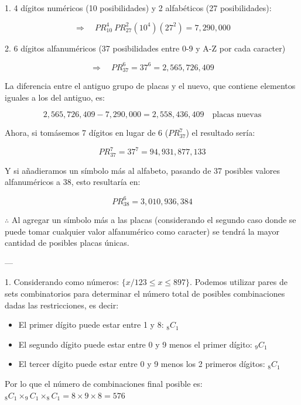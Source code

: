 \documentclass{article}
\begin{document}
1. 4 dígitos numéricos (10 posibilidades) y 2 alfabéticos (27 posibilidades):

$$\Rightarrow \quad PR^{4}_{10} \medspace PR^{2}_{27} (10^4)(27^2) = 7,290,000$$

2. 6 dígitos alfanuméricos (37 posibilidades entre 0-9 y A-Z por cada caracter)

$$\Rightarrow \quad PR^{6}_{37} = 37^6 = 2,565,726,409$$

La diferencia entre el antiguo grupo de placas y el nuevo, que contiene elementos iguales a los del antiguo, es:

$$2,565,726,409 - 7,290,000 = 2,558,436,409 \quad \text{placas nuevas}$$

Ahora, si tomásemos 7 dígitos en lugar de 6 ($PR^{7}_{37}$) el resultado sería:

$$PR^{7}_{37} = 37^7 = 94,931,877,133$$

Y si añadieramos un símbolo más al alfabeto, pasando de 37 posibles valores alfanuméricos a 38, esto resultaría en:

$$PR^{6}_{38} = 3,010,936,384$$

$\therefore$ Al agregar un símbolo más a las placas (considerando el segundo caso donde se puede tomar cualquier valor alfanumérico como caracter) se tendrá la mayor cantidad de posibles placas únicas.

---

\newpage


1. Considerando como números: $\{x / 123 \leq x \leq 897\}$. Podemos utilizar pares de sets combinatorios para determinar el número total de posibles combinaciones dadas las restricciones, es decir:

\begin{itemize}
    \item El primer dígito puede estar entre 1 y 8: $_8C_1$
    \item El segundo dígito puede estar entre 0 y 9 menos el primer dígito: $_9C_1$
    \item El tercer dígito puede estar entre 0 y 9 menos los 2 primeros dígitos: $_8C_1$
\end{itemize}

Por lo que el número de combinaciones final posible es: $_8C_1 \times _9C_1 \times _8C_1 = 8 \times 9 \times 8 = 576$
\end{document}
